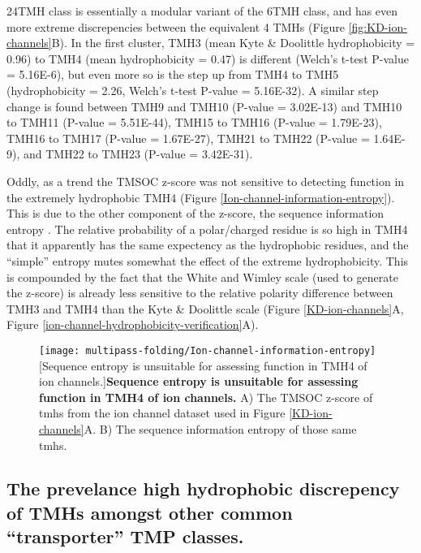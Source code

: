 24TMH class is essentially a modular variant of the 6TMH class, and has even more extreme discrepencies between the equivalent 4 TMHs (Figure \ref{fig:KD-ion-channels}B).
In the first cluster, TMH3 (mean Kyte \& Doolittle hydrophobicity = 0.96) to TMH4 (mean hydrophobicity = 0.47) is different (Welch's t\--test P\--value = 5.16E-6), but even more so is the step up from TMH4 to TMH5 (hydrophobicity = 2.26, Welch's t\--test P\--value = 5.16E-32).
A similar step change is found between TMH9 and TMH10 (P\--value = 3.02E-13) and TMH10 to TMH11 (P\--value = 5.51E-44), TMH15 to TMH16 (P\--value = 1.79E-23), TMH16 to TMH17 (P\--value = 1.67E-27), TMH21 to TMH22 (P\--value = 1.64E-9), and TMH22 to TMH23 (P\--value = 3.42E-31).

Oddly, as a trend the TMSOC z-score was not sensitive to detecting function in the extremely hydrophobic TMH4 (Figure \ref{Ion-channel-information-entropy}).
This is due to the other component of the z-score, the sequence information entropy \cite{Wong2011, Wong2012}.
The relative probability of a polar/charged residue is so high in TMH4 that it apparently has the same expectency as the hydrophobic residues, and the ``simple'' entropy mutes somewhat the effect of the extreme hydrophobicity.
This is compounded by the fact that the White and Wimley scale (used to generate the z-score) is already less sensitive to the relative polarity difference between TMH3 and TMH4 than the Kyte \& Doolittle scale (Figure \ref{KD-ion-channels}A, Figure \ref{ion-channel-hydrophobicity-verification}A).

\begin{figure}[!ht]
\centering
\texttt{[image: multipass-folding/Ion-channel-information-entropy]}
		[Sequence entropy is unsuitable for assessing function in TMH4 of ion channels.]{\textbf{Sequence entropy is unsuitable for assessing function in TMH4 of ion channels.}
    A) The TMSOC z-score \cite{Wong2011, Wong2012} of \gls{tmh}s from the ion channel dataset used in Figure \ref{KD-ion-channels}A.
    B) The sequence information entropy of those same \gls{tmh}s.
    }

\label{fig:Ion-channel-information-entropy}
\end{figure}


\subsection{The prevelance high hydrophobic discrepency of TMHs amongst other common ``transporter'' TMP classes.}

